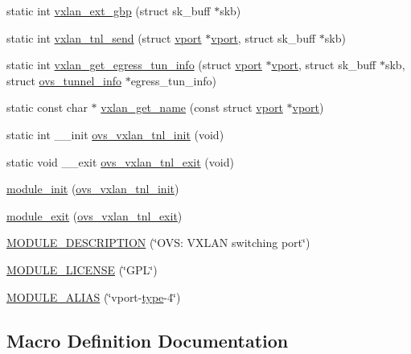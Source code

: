 \begin{DoxyCompactItemize}
static int \hyperlink{vport-vxlan_8c_a20eca97b66cc1631237638ba80d3f6f4}{vxlan\+\_\+ext\+\_\+gbp} (struct sk\+\_\+buff $\ast$skb)
\item 
static int \hyperlink{vport-vxlan_8c_a3f79b05ea9b700c041b3aff7361e707f}{vxlan\+\_\+tnl\+\_\+send} (struct \hyperlink{structvport}{vport} $\ast$\hyperlink{structvport}{vport}, struct sk\+\_\+buff $\ast$skb)
\item 
static int \hyperlink{vport-vxlan_8c_a24930f1f6ecb4c221d189f13253a5feb}{vxlan\+\_\+get\+\_\+egress\+\_\+tun\+\_\+info} (struct \hyperlink{structvport}{vport} $\ast$\hyperlink{structvport}{vport}, struct sk\+\_\+buff $\ast$skb, struct \hyperlink{structovs__tunnel__info}{ovs\+\_\+tunnel\+\_\+info} $\ast$egress\+\_\+tun\+\_\+info)
\item 
static const char $\ast$ \hyperlink{vport-vxlan_8c_a8c4bc3ac94b12c027f1c2148fae55d61}{vxlan\+\_\+get\+\_\+name} (const struct \hyperlink{structvport}{vport} $\ast$\hyperlink{structvport}{vport})
\item 
static int \+\_\+\+\_\+init \hyperlink{vport-vxlan_8c_a1c1c84a2865e1fdf35836751a795916c}{ovs\+\_\+vxlan\+\_\+tnl\+\_\+init} (void)
\item 
static void \+\_\+\+\_\+exit \hyperlink{vport-vxlan_8c_a93fd41de4d7cb36dccd5e2c57310ef71}{ovs\+\_\+vxlan\+\_\+tnl\+\_\+exit} (void)
\item 
\hyperlink{vport-vxlan_8c_a32ade2284afa4864170856c68e08907e}{module\+\_\+init} (\hyperlink{vport-vxlan_8c_a1c1c84a2865e1fdf35836751a795916c}{ovs\+\_\+vxlan\+\_\+tnl\+\_\+init})
\item 
\hyperlink{vport-vxlan_8c_acfe49db4b9b9e976d671d08c1bbf052f}{module\+\_\+exit} (\hyperlink{vport-vxlan_8c_a93fd41de4d7cb36dccd5e2c57310ef71}{ovs\+\_\+vxlan\+\_\+tnl\+\_\+exit})
\item 
\hyperlink{vport-vxlan_8c_a8c4652622a726ee59702be21c375bcd1}{M\+O\+D\+U\+L\+E\+\_\+\+D\+E\+S\+C\+R\+I\+P\+T\+I\+O\+N} (\char`\"{}O\+V\+S\+: V\+X\+L\+A\+N switching port\char`\"{})
\item 
\hyperlink{vport-vxlan_8c_ad94b36675e7eb067ea3ce6ff9e244a44}{M\+O\+D\+U\+L\+E\+\_\+\+L\+I\+C\+E\+N\+S\+E} (\char`\"{}G\+P\+L\char`\"{})
\item 
\hyperlink{vport-vxlan_8c_ad0e081f4770ba9f49ea55358f08183b1}{M\+O\+D\+U\+L\+E\+\_\+\+A\+L\+I\+A\+S} (\char`\"{}vport-\/\hyperlink{flow_8h_ab22aaab04f806700def00f32823fcb9e}{type}-\/4\char`\"{})
\end{DoxyCompactItemize}


\subsection{Macro Definition Documentation}
\hypertarget{vport-vxlan_8c_a1f8c165bf4196327bc3abff648276d92}{}
